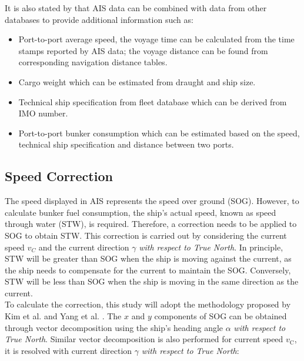 \pagebreak

It is also stated by  that AIS data can be combined with data from other databases to provide additional information such as:\\

\begin{itemize}
    \setlength\itemsep{0em}
    \item Port-to-port average speed, the voyage time can be calculated from the time stamps reported by AIS data; the voyage distance can be found from corresponding navigation distance tables.
    \item Cargo weight which can be estimated from draught and ship size.
    \item Technical ship specification from fleet database which can be derived from IMO number.
    \item Port-to-port bunker consumption which can be estimated based on the speed, technical ship specification and distance between two ports.
\end{itemize}

\subsection{Speed Correction}\label{sec:SOG_corr}

The speed displayed in AIS represents the speed over ground (SOG). However, to calculate bunker fuel consumption, the ship's actual speed, known as speed through water (STW), is required. Therefore, a correction needs to be applied to SOG to obtain STW. This correction is carried out by considering the current speed $v_C$ and the current direction $\gamma$ \emph{with respect to True North}. In principle, STW will be greater than SOG when the ship is moving against the current, as the ship needs to compensate for the current to maintain the SOG. Conversely, STW will be less than SOG when the ship is moving in the same direction as the current.\\

To calculate the correction, this study will adopt the methodology proposed by Kim et al.  and Yang et al. . The $x$ and $y$ components of SOG can be obtained through vector decomposition using the ship's heading angle $\alpha$ \emph{with respect to True North}. Similar vector decomposition is also performed for current speed $v_{\text{C}}$, it is resolved with current direction $\gamma$ \emph{with respect to True North}:\\

